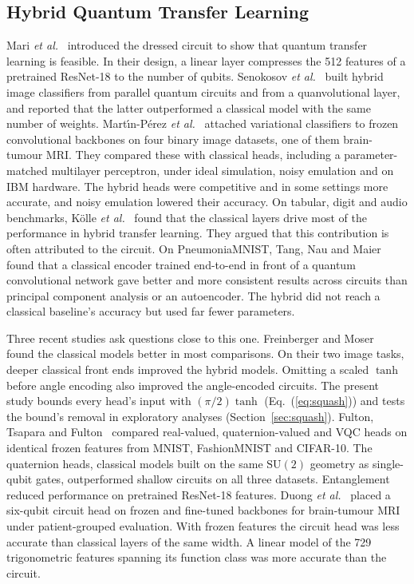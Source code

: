 \documentclass{ieeeaccess}
\newcommand{\vqc}{VQC}
\begin{document}
\subsection{Hybrid Quantum Transfer Learning}
Mari \emph{et al.}~\cite{mari2020} introduced the dressed circuit to show that quantum transfer learning is feasible. In their design, a linear layer compresses the 512 features of a pretrained ResNet-18 to the number of qubits. Senokosov \emph{et al.}~\cite{senokosov2024} built hybrid image classifiers from parallel quantum circuits and from a quanvolutional layer, and reported that the latter outperformed a classical model with the same number of weights. Mart\'{\i}n-P\'erez \emph{et al.}~\cite{martinperez2026} attached variational classifiers to frozen convolutional backbones on four binary image datasets, one of them brain-tumour MRI. They compared these with classical heads, including a parameter-matched multilayer perceptron, under ideal simulation, noisy emulation and on IBM hardware. The hybrid heads were competitive and in some settings more accurate, and noisy emulation lowered their accuracy. On tabular, digit and audio benchmarks, K\"olle \emph{et al.}~\cite{kolle2024} found that the classical layers drive most of the performance in hybrid transfer learning. They argued that this contribution is often attributed to the circuit. On PneumoniaMNIST, Tang, Nau and Maier~\cite{tang2025} found that a classical encoder trained end-to-end in front of a quantum convolutional network gave better and more consistent results across circuits than principal component analysis or an autoencoder. The hybrid did not reach a classical baseline's accuracy but used far fewer parameters.

Three recent studies ask questions close to this one. Freinberger and Moser~\cite{freinberger2026} found the classical models better in most comparisons. On their two image tasks, deeper classical front ends improved the hybrid models. Omitting a scaled $\tanh$ before angle encoding also improved the angle-encoded circuits. The present study bounds every head's input with $(\pi/2)\tanh$ (Eq.~(\ref{eq:squash})) and tests the bound's removal in exploratory analyses (Section~\ref{sec:squash}). Fulton, Tsapara and Fulton~\cite{fulton2026} compared real-valued, quaternion-valued and \vqc{} heads on identical frozen features from MNIST, FashionMNIST and CIFAR-10. The quaternion heads, classical models built on the same $\mathrm{SU}(2)$ geometry as single-qubit gates, outperformed shallow circuits on all three datasets. Entanglement reduced performance on pretrained ResNet-18 features. Duong \emph{et al.}~\cite{duong2026} placed a six-qubit circuit head on frozen and fine-tuned backbones for brain-tumour MRI under patient-grouped evaluation. With frozen features the circuit head was less accurate than classical layers of the same width. A linear model of the 729 trigonometric features spanning its function class was more accurate than the circuit.
\end{document}
